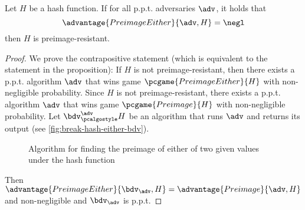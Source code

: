 \begin{proposition}
  Let $H$ be a hash function. If for all p.p.t. adversaries $\adv$, it holds that
  \[
  \advantage{PreimageEither}{\adv, H} = \negl
  \]
  then $H$ is preimage-resistant.
\end{proposition}
\begin{proof}
  We prove the contrapositive statement (which is equivalent to the statement in the proposition):
  If $H$ is not preimage-resistant, then there exists a p.p.t. algorithm $\adv$ that wins game $\pcgame{PreimageEither}{H}$ with non-negligible probability.
  Since $H$ is not preimage-resistant, there exists a p.p.t. algorithm $\adv$ that wins game $\pcgame{Preimage}{H}$ with non-negligible probability.
  Let $\bdv^\adv_\algo{H}$ be an algorithm that runs $\adv$ and returns its output (see \autoref{fig:break-hash-either-bdv}).
  \begin{figure}[tbhp]
  \begin{center}
    \begin{tcolorbox}[width=5cm]
      \begin{pchstack}[center]
      \end{pchstack}
    \end{tcolorbox}
  \end{center}
  \caption{Algorithm for finding the preimage of either of two given values under the hash function \label{fig:break-hash-either-bdv}}
  \end{figure}

  Then $\advantage{PreimageEither}{\bdv_\adv, H} = \advantage{Preimage}{\adv, H}$ and non-negligible and $\bdv_\adv$ is p.p.t.
\end{proof}


